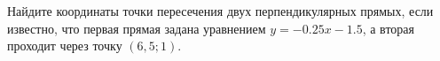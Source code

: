 \begin{ex}
	\begin{condition}
		Найдите координаты точки пересечения двух перпендикулярных прямых, если известно, что первая прямая задана уравнением \( y=-0.25x-1.5 \), а вторая проходит через точку \( (6,5;1) \).
	\end{condition}
\end{ex}
